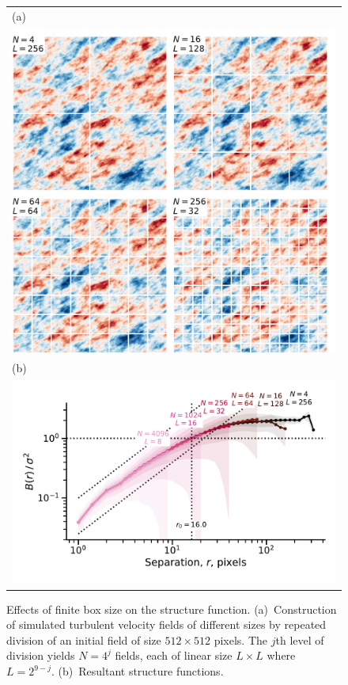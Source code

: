 \documentclass[fleqn,usenatbib, useAMS, a4paper]{mnras}
\begin{document}
\begin{figure}
  \begin{tabular}{@{} l @{}}
    (a)\\
    \includegraphics[width=\linewidth]{Figures/fake-finite-box-images}
    \\[\bigskipamount]
    (b)\\
    \includegraphics[width=\linewidth]{Figures/fake-finite-box-strucfunc}
  \end{tabular}
  \caption{Effects of finite box size on the structure function.
    (a)~Construction of simulated turbulent velocity fields of different sizes
    by repeated division of an initial field of size \(512 \times 512\) pixels.
    The \(j\)th level of division yields \(N = 4^j\) fields,
    each of linear size \(L \times L\) where \(L = 2^{9 - j}\). 
    (b)~Resultant structure functions.
  }
  \label{fig:finite-box}
\end{figure}
\end{document}
